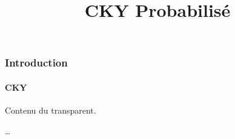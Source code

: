 \documentclass{beamer}
\begin{document}
\title{CKY Probabilisé}
\maketitle

\begin{frame} %
\frametitle{Introduction}
\framesubtitle{CKY}

Contenu du transparent.

\end{frame}

\begin{frame} %
…
\end{frame}
\end{document}
